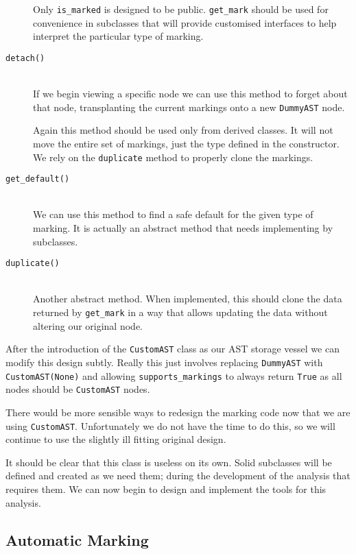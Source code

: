 \documentclass{report}
\begin{document}
\begin{description}
Only \texttt{is\_marked} is designed to be public. \texttt{get\_mark} should be used for convenience in subclasses that will provide
customised interfaces to help interpret the particular type of marking.

\item[\texttt{detach()}] \hfill \\
If we begin viewing a specific node we can use this method to forget about that node, transplanting the current markings onto a new
\texttt{DummyAST} node.

Again this method should be used only from derived classes. It will not move the entire set of markings, just the type defined
in the constructor. We rely on the \texttt{duplicate} method to properly clone the markings.

\item[\texttt{get\_default()}] \hfill \\
We can use this method to find a safe default for the given type of marking. It is actually an abstract method that needs implementing by
subclasses.

\item[\texttt{duplicate()}] \hfill \\
Another abstract method. When implemented, this should clone the data returned by \texttt{get\_mark} in a way that allows updating the
data without altering our original node.

\end{description}

After the introduction of the \texttt{CustomAST} class as our AST storage vessel we can modify this design subtly. Really this just
involves replacing \texttt{DummyAST} with \texttt{CustomAST(None)} and allowing \texttt{supports\_markings} to always return
\texttt{True} as all nodes should be \texttt{CustomAST} nodes.

There would be more sensible ways to redesign the marking code now that we are using \texttt{CustomAST}. Unfortunately we do not have the
time to do this, so we will continue to use the slightly ill fitting original design.

It should be clear that this class is useless on its own. Solid subclasses will be defined and created as we need them; during the
development of the analysis that requires them. We can now begin to design and implement the tools for this analysis.

\subsection{Automatic Marking}
\end{document}

